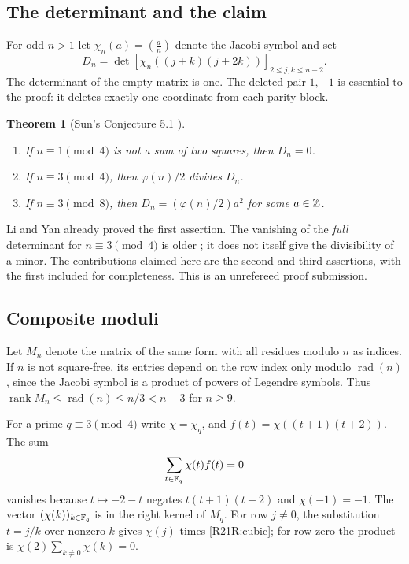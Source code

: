 \documentclass[11pt,a4paper]{article}
\newtheorem{SourceRcbRtheorem}{Theorem}
\begin{document}
\subsection{The determinant and the claim}
For odd $n>1$ let $\chi_n(a)=(\frac an)$ denote the Jacobi symbol and set
\[
 D_n=\det[\chi_n((j+k)(j+2k))]_{2\le j,k\le n-2}.
\]
The determinant of the empty matrix is one. The deleted pair $1,-1$ is essential to the proof: it deletes exactly one coordinate from each parity block.
\begin{SourceRcbRtheorem}[Sun's Conjecture 5.1 \cite{R21R:Sun}]
\leavevmode
\begin{enumerate}
\item If $n\equiv1\pmod4$ is not a sum of two squares, then $D_n=0$.
\item If $n\equiv3\pmod4$, then $\varphi(n)/2$ divides $D_n$.
\item If $n\equiv3\pmod8$, then $D_n=(\varphi(n)/2)a^2$ for some $a\in\mathbb Z$.
\end{enumerate}
\end{SourceRcbRtheorem}
Li and Yan \cite{R21R:LY} already proved the first assertion. The vanishing of the \emph{full} determinant for $n\equiv3\pmod4$ is older \cite{R21R:K}; it does not itself give the divisibility of a minor. The contributions claimed here are the second and third assertions, with the first included for completeness. This is an unrefereed proof submission.

\subsection{Composite moduli}
Let $M_n$ denote the matrix of the same form with all residues modulo $n$ as indices. If $n$ is not square-free, its entries depend on the row index only modulo $\operatorname{rad}(n)$, since the Jacobi symbol is a product of powers of Legendre symbols. Thus $\operatorname{rank} M_n\le \operatorname{rad}(n)\le n/3<n-3$ for $n\ge9$.

For a prime $q\equiv3\pmod4$ write $\chi=\chi_q$, and $f(t)=\chi((t+1)(t+2))$. The sum
\begin{equation}
 \sum_{t\in\mathbb F_q}\chi(t)f(t)=0 \label{R21R:cubic}
\end{equation}
vanishes because $t\mapsto-2-t$ negates $t(t+1)(t+2)$ and $\chi(-1)=-1$. The vector $(\chi(k))_{k\in\mathbb F_q}$ is in the right kernel of $M_q$. For row $j\ne0$, the substitution $t=j/k$ over nonzero $k$ gives $\chi(j)$ times \eqref{R21R:cubic}; for row zero the product is $\chi(2)\sum_{k\ne0}\chi(k)=0$.
\end{document}
